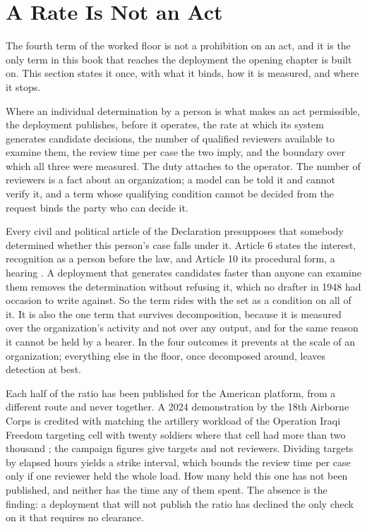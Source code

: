 \section{A Rate Is Not an Act}
\label{sec:rate-act}
The fourth term of the worked floor is not a prohibition on an act, and it is the only term in this book that reaches the deployment the opening chapter is built on. This section states it once, with what it binds, how it is measured, and where it stops.

Where an individual determination by a person is what makes an act permissible, the deployment publishes, before it operates, the rate at which its system generates candidate decisions, the number of qualified reviewers available to examine them, the review time per case the two imply, and the boundary over which all three were measured. The duty attaches to the operator. The number of reviewers is a fact about an organization; a model can be told it and cannot verify it, and a term whose qualifying condition cannot be decided from the request binds the party who can decide it.

Every civil and political article of the Declaration presupposes that somebody determined whether this person's case falls under it. Article 6 states the interest, recognition as a person before the law, and Article 10 its procedural form, a hearing \autocite{un1948udhr}. A deployment that generates candidates faster than anyone can examine them removes the determination without refusing it, which no drafter in 1948 had occasion to write against. So the term rides with the set as a condition on all of it. It is also the one term that survives decomposition, because it is measured over the organization's activity and not over any output, and for the same reason it cannot be held by a bearer. In the four outcomes it prevents at the scale of an organization; everything else in the floor, once decomposed around, leaves detection at best.

Each half of the ratio has been published for the American platform, from a different route and never together. A 2024 demonstration by the 18th Airborne Corps is credited with matching the artillery workload of the Operation Iraqi Freedom targeting cell with twenty soldiers where that cell had more than two thousand \autocite{defensenews2024maven,cset2024techcoalition}; the campaign figures give targets and not reviewers. Dividing targets by elapsed hours yields a strike interval, which bounds the review time per case only if one reviewer held the whole load. How many held this one has not been published, and neither has the time any of them spent. The absence is the finding: a deployment that will not publish the ratio has declined the only check on it that requires no clearance.

